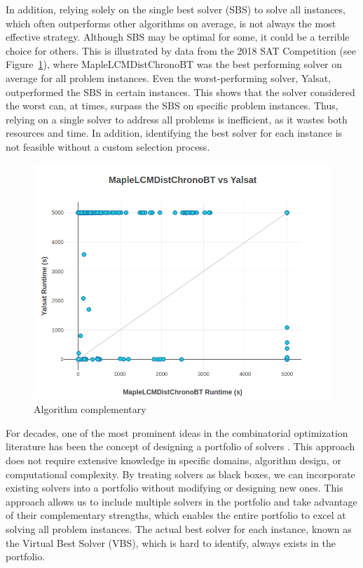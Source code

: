 In addition, relying solely on the single best solver (SBS) to solve all instances, which often outperforms other algorithms on average, is not always the most effective strategy. Although SBS may be optimal for some, it could be a terrible choice for others. This is illustrated by data from the 2018 SAT Competition (see Figure~\ref{fig:complementarity}), where MapleLCMDistChronoBT was the best performing solver on average for all problem instances. Even the worst-performing solver, Yalsat, outperformed the SBS in certain instances. This shows that the solver considered the worst can, at times, surpass the SBS on specific problem instances. Thus, relying on a single solver to address all problems is inefficient, as it wastes both resources and time. In addition, identifying the best solver for each instance is not feasible without a custom selection process.

\begin{figure}
    \setlength{\parindent}{0pt}
    \centering
    \includegraphics[width =.9\linewidth]{plots/complementary.png}
\small \caption{Algorithm complementary}
    \label{fig:complementarity}
\end{figure}

For decades, one of the most prominent ideas in the combinatorial optimization literature has been the concept of designing a portfolio of solvers \cite{GOMES200143,Huberman1997}. This approach does not require extensive knowledge in specific domains, algorithm design, or computational complexity. By treating solvers as black boxes, we can incorporate existing solvers into a portfolio without modifying or designing new ones. This approach allows us to include multiple solvers in the portfolio and take advantage of their complementary strengths, which enables the entire portfolio to excel at solving all problem instances. The actual best solver for each instance, known as the Virtual Best Solver (VBS), which is hard to identify, always exists in the portfolio.

